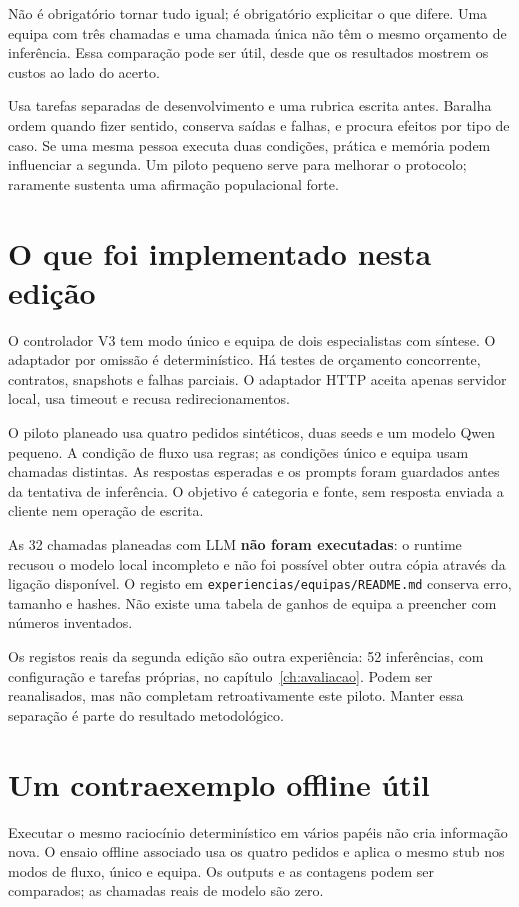 Não é obrigatório tornar tudo igual; é obrigatório explicitar o que difere. Uma equipa com três chamadas e uma chamada única não têm o mesmo orçamento de inferência. Essa comparação pode ser útil, desde que os resultados mostrem os custos ao lado do acerto.

Usa tarefas separadas de desenvolvimento e uma rubrica escrita antes. Baralha ordem quando fizer sentido, conserva saídas e falhas, e procura efeitos por tipo de caso. Se uma mesma pessoa executa duas condições, prática e memória podem influenciar a segunda. Um piloto pequeno serve para melhorar o protocolo; raramente sustenta uma afirmação populacional forte.

\section{O que foi implementado nesta edição}
O controlador V3 tem modo único e equipa de dois especialistas com síntese. O adaptador por omissão é determinístico. Há testes de orçamento concorrente, contratos, snapshots e falhas parciais. O adaptador HTTP aceita apenas servidor local, usa timeout e recusa redirecionamentos.

O piloto planeado usa quatro pedidos sintéticos, duas seeds e um modelo Qwen pequeno. A condição de fluxo usa regras; as condições único e equipa usam chamadas distintas. As respostas esperadas e os prompts foram guardados antes da tentativa de inferência. O objetivo é categoria e fonte, sem resposta enviada a cliente nem operação de escrita.

As 32 chamadas planeadas com LLM \textbf{não foram executadas}: o runtime recusou o modelo local incompleto e não foi possível obter outra cópia através da ligação disponível. O registo em \texttt{experiencias/equipas/README.md} conserva erro, tamanho e hashes. Não existe uma tabela de ganhos de equipa a preencher com números inventados.

Os registos reais da segunda edição são outra experiência: 52 inferências, com configuração e tarefas próprias, no capítulo~\ref{ch:avaliacao}. Podem ser reanalisados, mas não completam retroativamente este piloto. Manter essa separação é parte do resultado metodológico.

\section{Um contraexemplo offline útil}
Executar o mesmo raciocínio determinístico em vários papéis não cria informação nova. O ensaio offline associado usa os quatro pedidos e aplica o mesmo stub nos modos de fluxo, único e equipa. Os outputs e as contagens podem ser comparados; as chamadas reais de modelo são zero.


